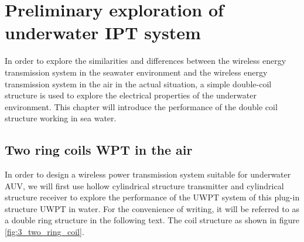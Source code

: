 \chapter{Preliminary exploration of underwater IPT system}

In order to explore the similarities and differences between the wireless energy transmission system in the seawater environment and the wireless energy transmission system in the air in the actual situation, a simple double-coil structure is used to explore the electrical properties of the underwater environment. This chapter will introduce the performance of the double coil structure working in sea water.




\section{Two ring coils WPT in the air}
In order to design a wireless power transmission system suitable for underwater AUV, we will first use hollow cylindrical structure transmitter and cylindrical structure receiver to explore the performance of the UWPT system of this plug-in structure UWPT in water. For the convenience of writing, it will be referred to as a double ring structure in the following text. The coil structure as shown in figure \ref{fig:3_two_ring_coil}.


